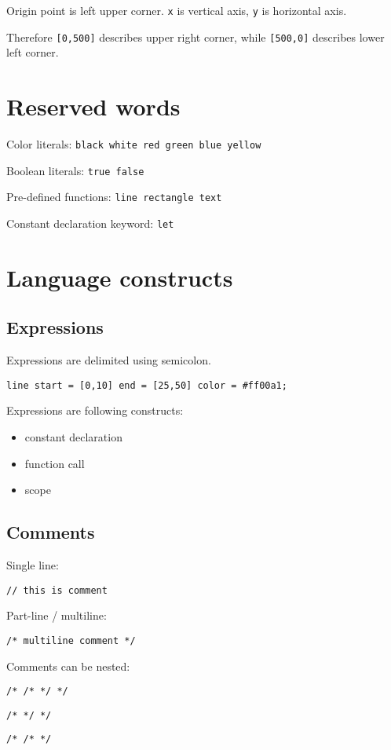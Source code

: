 \documentclass{scrreprt}
\begin{document}
Origin point is left upper corner. \texttt{x} is vertical axis, \texttt{y} is horizontal axis.

Therefore \texttt{[0,500]} describes upper right corner, while \texttt{[500,0]} describes lower left corner.

\chapter{Reserved words}

Color literals: \texttt{black white red green blue yellow}

Boolean literals: \texttt{true false}

Pre-defined functions: \texttt{line rectangle text}

Constant declaration keyword: \texttt{let}

\chapter{Language constructs}

\section{Expressions}

Expressions are delimited using semicolon.

\texttt{line start = [0,10] end = [25,50] color = \#ff00a1;}

Expressions are following constructs:

\begin{itemize}
    \item constant declaration
    \item function call
    \item scope
\end{itemize}

\section{Comments}

Single line:

\texttt{// this is comment}

Part-line / multiline:

\texttt{/* multiline comment */}

Comments can be nested:

\texttt{/* /* */ */}

\texttt{/* */ */}

\texttt{/* /* */}
\end{document}
